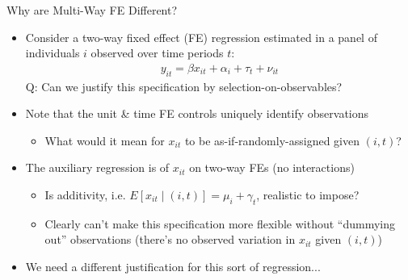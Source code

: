 \documentclass[11pt, english]{beamer}
\begin{document}
	\begin{frame}{Why are Multi-Way FE Different?}
		\begin{itemize}
			\item Consider a two-way fixed effect (FE) regression estimated in a panel
				of individuals $i$ observed over time periods $t$:
				\begin{align*}
					y_{it}= \beta x_{it}+ \alpha_{i} + \tau_{t} + \nu_{it}
				\end{align*}\pause{} Q: Can we justify this specification by selection-on-observables?
				\bigskip
				\pause{}

			\item Note that the unit \& time FE controls uniquely identify observations
				\smallskip
				\pause{}
				\begin{itemize}
					\item What would it mean for $x_{it}$ to be as-if-randomly-assigned given
						$(i,t)$?
				\end{itemize}\pause{}
				\bigskip

			\item The auxiliary regression is of $x_{it}$ on two-way FEs (no
				interactions)
				\smallskip
				\begin{itemize}
					\item Is additivity, i.e. $E[x_{it}\mid (i,t)]=\mu_{i} + \gamma_{t}$,
						realistic to impose?
						\smallskip
						\pause{}

					\item Clearly can't make this specification more flexible without ``dummying
						out'' observations (there's no observed variation in $x_{it}$ given
						$(i,t)$)
				\end{itemize}
				\medskip
				\pause{}

			\item We need a different justification for this sort of regression...
		\end{itemize}
	\end{frame}
\end{document}
